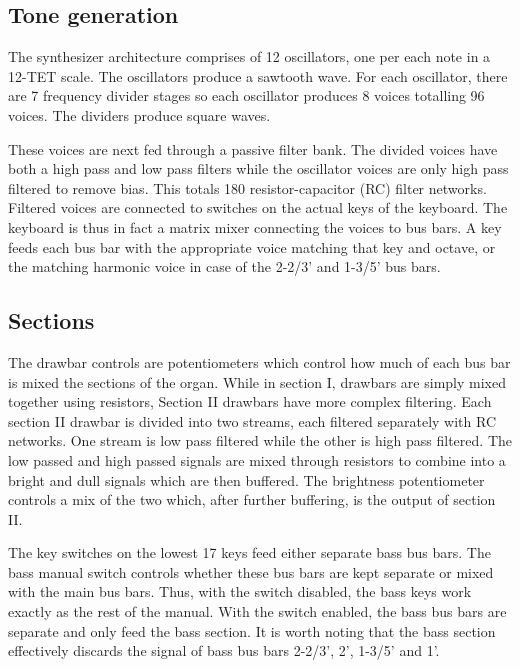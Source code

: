 \documentclass[11pt,a4paper]{article}
\begin{document}
\subsection{Tone generation}

The synthesizer architecture comprises of 12 oscillators, one per each note in a 12-TET scale. The oscillators produce a sawtooth wave. For each oscillator, there are 7 frequency divider stages so each oscillator produces 8 voices totalling 96 voices. The dividers produce square waves. 

These voices are next fed through a passive filter bank. The divided voices have both a high pass and low pass filters while the oscillator voices are only high pass filtered to remove bias. This totals 180 resistor-capacitor (RC) filter networks. Filtered voices are connected to switches on the actual keys of the keyboard. The keyboard is thus in fact a matrix mixer connecting the voices to bus bars. A key feeds each bus bar with the appropriate voice matching that key and octave, or the matching harmonic voice in case of the 2-2/3' and 1-3/5' bus bars. 

\subsection{Sections}
\label{section:sections}

The drawbar controls are potentiometers which control how much of each bus bar is mixed the sections of the organ. While in section I, drawbars are simply mixed together using resistors, Section II drawbars have more complex filtering. Each section II drawbar is divided into two streams, each filtered separately with RC networks. One stream is low pass filtered while the other is high pass filtered. The low passed and high passed signals are mixed through resistors to combine into a bright and dull signals which are then buffered. The brightness potentiometer controls a mix of the two which, after further buffering, is the output of section II. 

The key switches on the lowest 17 keys feed either separate bass bus bars. The bass manual switch controls whether these bus bars are kept separate or mixed with the main bus bars. Thus, with the switch disabled, the bass keys work exactly as the rest of the manual. With the switch enabled, the bass bus bars are separate and only feed the bass section. It is worth noting that the bass section effectively discards the signal of bass bus bars 2-2/3', 2', 1-3/5' and 1'.
\end{document}
